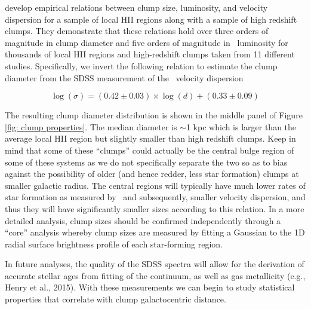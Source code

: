 
\cite{Wisnioski2012} develop empirical relations between clump size, luminosity, and velocity dispersion for a sample of local HII regions along with a sample of high redshift clumps. They demonstrate that these relations hold over three orders of magnitude in clump diameter and five orders of magnitude in \ha~luminosity for thousands of local HII regions and high-redshift clumps taken from 11 different studies. Specifically, we invert the following relation to estimate the clump diameter from the SDSS measurement of the \ha~velocity dispersion

\begin{equation}\label{eqn: clump diameter}
\log(\sigma) = (0.42 \pm 0.03) \times \log(d) + (0.33 \pm 0.09)
\end{equation}

The resulting clump diameter distribution is shown in the middle panel of Figure \ref{fig: clump properties}. The median diameter is $\sim$1 kpc which is larger than the average local HII region but slightly smaller than high redshift clumps.  Keep in mind that some of these ``clumps'' could actually be the central bulge region of some of these systems as we do not specifically separate the two so as to bias against the possibility of older (and hence redder, less star formation) clumps at smaller galactic radius. The central regions will typically have much lower rates of star formation as measured by \ha~and subsequently, smaller velocity dispersion, and thus they will have significantly smaller sizes according to this relation. In a more detailed analysis, clump sizes should be confirmed independently through a ``core'' analysis whereby clump sizes are measured by fitting a Gaussian to the 1D radial surface brightness profile of each star-forming region.  



In future analyses, the quality of the SDSS spectra will allow for the derivation of accurate stellar ages from fitting of the continuum, as well as gas metallicity (e.g., Henry et al., 2015). With these measurements we can begin to study statistical properties that correlate with clump galactocentric distance. 

